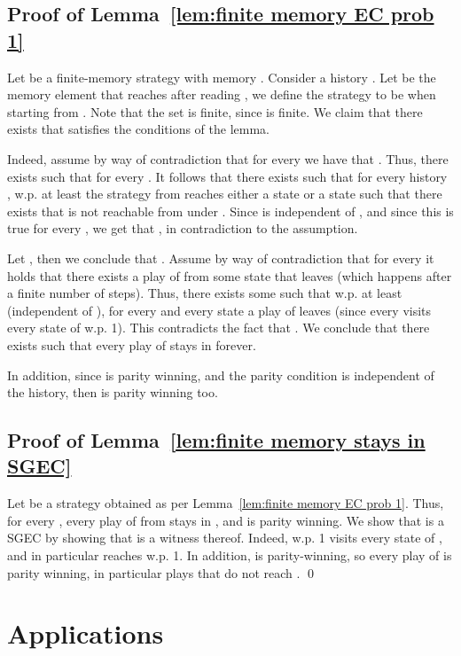\documentclass[runningheads,a4paper]{llncs}
\newcommand{\sgec}{{SGEC}\xspace}
\begin{document}
\subsection{Proof of Lemma~\ref{lem:finite memory EC prob 1}}
\label{apx:finite memory EC prob 1}
Let  be a finite-memory strategy with memory . Consider a history . Let  be the memory element that  reaches after reading , we define the strategy  to be  when starting from . Note that the set  is finite, since  is finite.
We claim that there exists  that satisfies the conditions of the lemma. 

Indeed, assume by way of contradiction that for every  we have that . Thus, there exists  such that  for every . It follows that there exists  such that for every history , w.p. at least  the strategy  from  reaches either a state  or a state  such that there exists  that is not reachable from  under . Since  is independent of , and since this is true for every , we get that , in contradiction to the assumption. 

Let , then we conclude that . Assume by way of contradiction that for every  it holds that there exists a play of  from some state  that leaves  (which happens after a finite number of steps). Thus, there exists some  such that w.p. at least  (independent of ), for every  and every state  a play of  leaves  (since every  visits every state of  w.p. 1). This contradicts the fact that . 
We conclude that there exists  such that every play of  stays in  forever. 

In addition, since  is parity winning, and the parity condition is independent of the history, then  is parity winning too.


\subsection{Proof of Lemma~\ref{lem:finite memory stays in SGEC}}
\label{apx:finite memory stays in SGEC}
Let  be a strategy obtained as per Lemma~\ref{lem:finite memory EC prob 1}. Thus,  for every ,  every play of  from  stays in , and  is parity winning. We show that  is a \sgec by showing that  is a witness thereof.
Indeed, w.p. 1  visits every state of , and in particular  reaches  w.p. 1. In addition,  is parity-winning, so every play of  is parity winning, in particular plays that do not reach .
\qed

\section{Applications}
\label{app app}
\end{document}

